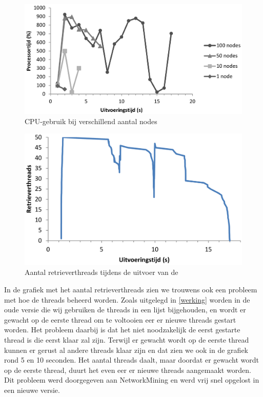 \begin{figure}[h]
	\centering
	\includegraphics[scale=0.40]{figures/cpu-100nodes}
	\caption{CPU-gebruik bij verschillend aantal nodes}
	\label{fig-cpu-aantalnodes}
\end{figure}

\begin{figure}[h]
	\centering
	\includegraphics[scale=0.30]{figures/threads-100nodes}
	\caption{Aantal retrieverthreads tijdens de uitvoer van de \nwmretriever{}}
	\label{fig-retrieverthreads}
\end{figure}

\begin{minipage}{\textwidth}
In de grafiek met het aantal retrieverthreads zien we trouwens ook een probleem met hoe de threads beheerd worden.
Zoals uitgelegd in \cref{werking} worden in de oude versie die wij gebruiken de threads in een lijst bijgehouden,
en wordt er gewacht op de eerste thread om te voltooien eer er nieuwe threads gestart worden.
Het probleem daarbij is dat het niet noodzakelijk de eerst gestarte thread is die eerst klaar zal zijn.
Terwijl er gewacht wordt op de eerste thread kunnen er gerust al andere threads klaar zijn en dat zien we ook in de grafiek rond 5 en 10 seconden.
Het aantal threads daalt, maar doordat er gewacht wordt op de eerste thread, duurt het even eer er nieuwe threads aangemaakt worden.
Dit probleem werd doorgegeven aan NetworkMining en werd vrij snel opgelost in een nieuwe versie.
\end{minipage}

